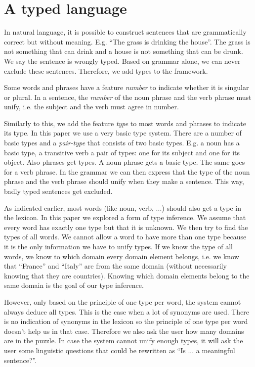 \section{A typed language}
In natural language, it is possible to construct sentences that are grammatically correct but without meaning. E.g. ``The grass is drinking the house''. The grass is not something that can drink and a house is not something that can be drunk. We say the sentence is wrongly typed. Based on grammar alone, we can never exclude these sentences. Therefore, we add types to the framework.

Some words and phrases have a feature \textit{number} to indicate whether it is singular or plural. In a sentence, the \textit{number} of the noun phrase and the verb phrase must unify, i.e. the subject and the verb must agree in number.

Similarly to this, we add the feature \textit{type} to most words and phrases to indicate its type. In this paper we use a very basic type system. There are a number of basic types and a \textit{pair-type} that consists of two basic types. E.g. a noun has a basic type, a transitive verb a pair of types: one for its subject and one for its object. Also phrases get types. A noun phrase gets a basic type. The same goes for a verb phrase. In the grammar we can then express that the type of the noun phrase and the verb phrase should unify when they make a sentence. This way, badly typed sentences get excluded.

As indicated earlier, most words (like noun, verb, ...) should also get a type in the lexicon. In this paper we explored a form of type inference. We assume that every word has exactly one type but that it is unknown. We then try to find the types of all words. We cannot allow a word to have more than one type because it is the only information we have to unify types. If we know the type of all words, we know to which domain every domain element belongs, i.e. we know that ``France'' and ``Italy'' are from the same domain (without necessarily knowing that they are countries). Knowing which domain elements belong to the same domain is the goal of our type inference.

However, only based on the principle of one type per word, the system cannot always deduce all types. This is the case when a lot of synonyms are used. There is no indication of synonyms in the lexicon so the principle of one type per word doesn't help us in that case. Therefore we also ask the user how many domains are in the puzzle. In case the system cannot unify enough types, it will ask the user some linguistic questions that could be rewritten as ``Is ... a meaningful sentence?''.

